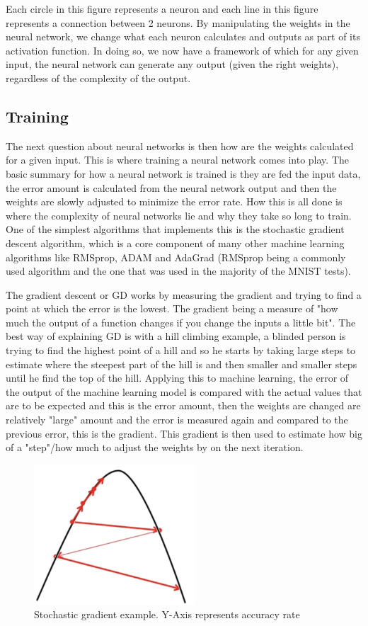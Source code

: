 \documentclass[a4paper,twoside,phd]{BYUPhys}
\begin{document}
Each circle in this figure represents a neuron and each line in this figure represents a connection between 2 neurons. By manipulating the weights in the neural network, we change what each neuron calculates and outputs as part of its activation function. In doing so, we now have a framework of which for any given input, the neural network can generate any output (given the right weights), regardless of the complexity of the output\cite{nielsen_2018}. 

\subsection{Training}
The next question about neural networks is then how are the weights calculated for a given input. This is where training a neural network comes into play. The basic summary for how a neural network is trained is they are fed the input data, the error amount is calculated from the neural network output and then the weights are slowly adjusted to minimize the error rate. How this is all done is where the complexity of neural networks lie and why they take so long to train. One of the simplest algorithms that implements this is the stochastic gradient descent algorithm, which is a core component of many other machine learning algorithms like RMSprop, ADAM and AdaGrad (RMSprop being a commonly used algorithm and the one that was used in the majority of the MNIST tests). 

The gradient descent or GD works by measuring the gradient and trying to find a point at which the error is the lowest. The gradient being a measure of "how much the output of a function changes if you change the inputs a little bit"\cite{towards_data_science}.
The best way of explaining GD is with a hill climbing example, a blinded person is trying to find the highest point of a hill and so he starts by taking large steps to estimate where the steepest part of the hill is and then smaller and smaller steps until he find the top of the hill. Applying this to machine learning, the error of the output of the machine learning model is compared with the actual values that are to be expected and this is the error amount, then the weights are changed are relatively "large" amount and the error is measured again and compared to the previous error, this is the gradient. This gradient is then used to estimate how big of a "step"/how much to adjust the weights by on the next iteration.
\begin{figure}[H]
\centering
\includegraphics[width=6cm]{pictures/gradient.png}
\caption{Stochastic gradient example.
Y-Axis represents accuracy rate}
\label{fig:gradient}
\end{figure}
\end{document}
